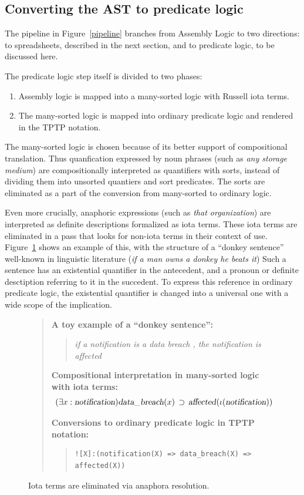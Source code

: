 \documentclass{IOS-Book-Article}
\newcommand{\eop}[1]{\mbox{\textsl{#1}}}
\newcommand{\bequ}{\begin{quote}}
\newcommand{\enqu}{\end{quote}}
\begin{document}
\subsection{Converting the AST to predicate logic}

The pipeline in Figure~\ref{pipeline} branches from Assembly Logic to two directions: to spreadsheets, described in the next section, and to predicate logic, to be discussed here.

The predicate logic step itself is divided to two phases:
\begin{enumerate}
\item Assembly logic is mapped into a many-sorted logic with Russell iota terms.
\item The many-sorted logic is mapped into ordinary predicate logic and rendered in the TPTP notation.
\end{enumerate}
The many-sorted logic is chosen because of its better support of compositional translation.
Thus quanfication expressed by noun phrases (such as \textit{any storage medium}) are compositionally interpreted as quantifiers with sorts, instead of dividing them into unsorted quantiers and sort predicates.
The sorts are eliminated as a part of the conversion from many-sorted to ordinary logic.

Even more crucially, anaphoric expressions (such as \textit{that organization}) are interpreted as definite descriptions formalized as iota terms.
These iota terms are eliminated in a pass that looks for non-iota terms in their context of use.
Figure~\ref{anaphora} shows an example of this, with the structure of a ``donkey sentence'' well-known in linguistic literature (\textit{if a man owns a donkey he beats it}) \cite{geach-1962,kamp-1981}
Such a sentence has an existential quantifier in the antecedent, and a pronoun or definite desctiption referring to it in the succedent.
To express this reference in ordinary predicate logic, the existential quantifier is changed into a universal one with a wide scope of the implication.

 \begin{figure}
  \begin{framed}
  \bequ
  \textbf{A toy example of a ``donkey sentence'':}
  \bequ
 \textit{if a notification is a data breach , the notification is affected}
 \enqu

 \textbf{Compositional interpretation in many-sorted logic with iota terms:}
 \[
(\exists x : \eop{notification})\eop{data\_breach}(x) \, \supset \, \eop{affected}(\iota(\eop{notification}))
\]

 \textbf{Conversions to ordinary predicate logic in TPTP notation:}
 \bequ
\begin{verbatim}
![X]:(notification(X) => data_breach(X) => affected(X))
\end{verbatim}
 \enqu
 \enqu
   \end{framed}
 \caption{Iota terms are eliminated via anaphora resolution.
 }
\label{anaphora}
\end{figure}
\end{document}

